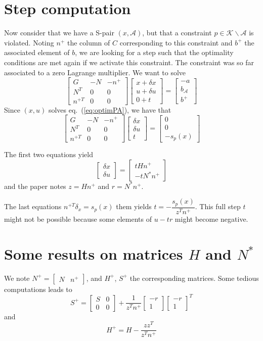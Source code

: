 \documentclass[11pt,a4paper]{article}
\newcommand{\BIN}{\begin{bmatrix}}
\newcommand{\BOUT}{\end{bmatrix}}
\newcommand{\eq}[1]{eq.~(\ref{eq:#1})}
\newcommand{\act}{\mathcal{A}}
\begin{document}
\section{Step computation}
Now consider that we have a S-pair $(x,\act)$, but that a constraint $p \in \mathcal{K} \backslash \act$ is violated. Noting $n^+$ the column of $C$ corresponding to this constraint and $b^+$ the associated element of $b$, we are looking for a step such that the optimality conditions are met again if we activate this constraint. The constraint was so far associated to a zero Lagrange multiplier. We want to solve
\begin{equation}
	\BIN G & -N & -n^+ \\ N^T & 0 & 0 \\ n^{+T} & 0 & 0\BOUT \BIN x + \delta x \\ u + \delta u \\ 0 + t\BOUT = \BIN -a \\ b_\act \\ b^+\BOUT
\end{equation}
Since $(x,u)$ solves \eq{optimPA}, we have that
\begin{equation}
	\BIN G & -N & -n^+ \\ N^T & 0 & 0 \\ n^{+T} & 0 & 0\BOUT \BIN \delta x \\ \delta u \\ t\BOUT = \BIN 0 \\ 0 \\ - s_p(x)\BOUT
\end{equation}

The first two equations yield
\begin{equation}
	\BIN \delta x \\ \delta u \BOUT = \BIN t H n^+ \\ -t N^* n^+ \BOUT
\end{equation}
and the paper notes $z = H n^+$ and $r = N^* n^+$.

The last equations $ n^{+T} \delta_x = s_p(x)$ them yields $t = -\dfrac{s_p(x)}{z^Tn^+}$. This full step $t$ might not be possible because some elements of $u - tr$ might become negative.

\section{Some results on matrices $H$ and $N^*$}
We note $N^+ = \BIN N & n^+\BOUT$, and $H^+$, $S^+$ the corresponding matrices.
Some tedious computations leads to
\begin{equation}
	S^+ = \BIN S & 0 \\ 0 & 0 \BOUT + \frac{1}{z^T n^+} \BIN -r \\ 1\BOUT \BIN -r \\ 1\BOUT^T
\end{equation}
and
\begin{equation}
	H^+ = H - \frac{z z^T}{z^T n^+}
\end{equation}



\end{document}
